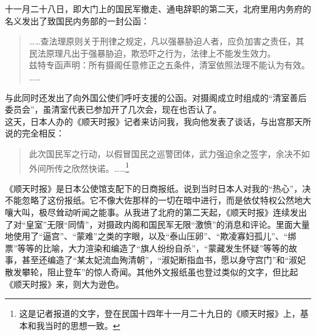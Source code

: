 十一月二十八日，即大门上的国民军撤走、通电辞职的第二天，北府里用内务府的名义发出了致国民内务部的一封公函：\\

\begin{quote}
	……查法理原则关于刑律之规定，凡以强暴胁迫人者，应负加害之责任，其民法原理凡出于强暴胁迫，欺恐吓之行为，法律上不能发生效力。\\

兹特专函声明：所有摄阁任意修正之五条件，清室依照法理不能认为有效。\\

……\\
\end{quote}

与此同时还发出了向外国公使们呼吁支援的公函。对摄阁成立时组成的“清室善后委员会”，虽清室代表已参加开了几次会，现在也否认了。\\

这天，日本人办的《顺天时报》记者来访问我，我向他发表了谈话，与出宫那天所说的完全相反：\\

\begin{quote}
	此次国民军之行动，以假冒国民之巡警团体，武力强迫余之签字，余决不如外间所传之欣然快诺。……\footnote{这是记者报道的文字，登在民国十四年十一月二十九日的《顺天时报》上，基本和我当时的思想一致。}\\
\end{quote}

《顺天时报》是日本公使馆支配下的日商报纸。说到当时日本人对我的“热心”，决不能忽略了这份报纸。它不像大佐那样的一切在暗中进行，而是依仗特权公然地大嚷大叫，极尽耸动听闻之能事。从我进了北府的第二天起，《顺天时报》连续发出了对“皇室”无限“同情”，对摄政内阁和国民军无限“激愤”的消息和评论。里面大量地使用了“逼宫”、“蒙难”之类的字眼，以及“泰山压卵”、“欺凌寡妇孤儿”、“绑票”等等的比喻，大力渲染和编造了“旗人纷纷自杀”，“蒙藏发生怀疑”等等的故事，甚至还编造了“某太妃流血殉清朝”，“淑妃断指血书，愿以身守宫门”和“淑妃散发攀轮，阻止登车”的惊人奇闻。其他外文报纸虽也登过类似的文字，但比起《顺天时报》来，则大为逊色。
